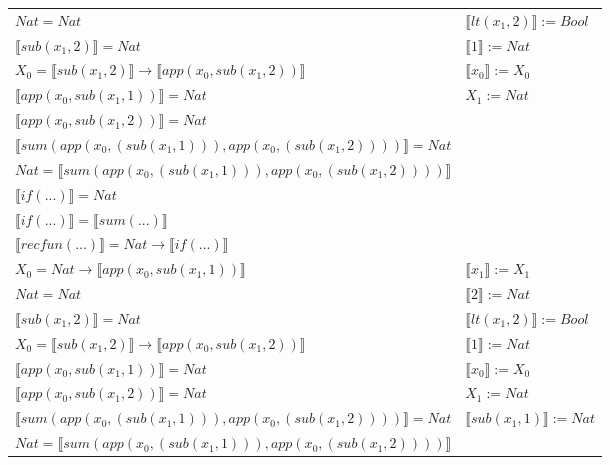 \begin{exercise}
\begin{description}
\begin{center}
\begin{longtable}[!h]{ | l | l | }
                        $Nat = Nat$ & $ \llbracket lt(x_1 , 2) \rrbracket := Bool$ \\
                        $ \llbracket sub(x_1,2) \rrbracket = Nat$ & $ \llbracket 1 \rrbracket := Nat$ \\
                        $X_0 =  \llbracket sub(x_1,2) \rrbracket \to  \llbracket app(x_0, sub(x_1,2)) \rrbracket$ & $ \llbracket x_0 \rrbracket := X_0$  \\
                        $ \llbracket app(x_0, sub(x_1,1)) \rrbracket = Nat$ & $X_1 := Nat$\\
                        $ \llbracket app(x_0, sub(x_1,2)) \rrbracket = Nat$ & \\
                        $ \llbracket sum(app(x_0, (sub(x_1,1))), app(x_0, (sub(x_1,2))))  \rrbracket = Nat$ & \\
                        $Nat =  \llbracket sum(app(x_0, (sub(x_1,1))), app(x_0, (sub(x_1,2)))) \rrbracket$ & \\
                        $ \llbracket if(...) \rrbracket = Nat$ & \\
                        $ \llbracket if(...) \rrbracket =  \llbracket sum(...) \rrbracket$ & \\
                        $ \llbracket recfun(...) \rrbracket =   Nat  \to  \llbracket if(...) \rrbracket $ & \\
                    \hline
                        $X_0 = Nat \to  \llbracket app(x_0, sub(x_1,1)) \rrbracket$ &   $ \llbracket x_1 \rrbracket := X_1$ \\
                        $Nat = Nat$ & $ \llbracket 2 \rrbracket := Nat$ \\
                        $ \llbracket sub(x_1,2) \rrbracket = Nat$ & $ \llbracket lt(x_1 , 2) \rrbracket := Bool$ \\
                        $X_0 =  \llbracket sub(x_1,2) \rrbracket \to  \llbracket app(x_0, sub(x_1,2)) \rrbracket$ &  $ \llbracket 1 \rrbracket := Nat$ \\
                        $ \llbracket app(x_0, sub(x_1,1)) \rrbracket = Nat$ & $ \llbracket x_0 \rrbracket := X_0$ \\
                        $ \llbracket app(x_0, sub(x_1,2)) \rrbracket = Nat$ & $X_1 := Nat$ \\
                        $ \llbracket sum(app(x_0, (sub(x_1,1))), app(x_0, (sub(x_1,2))))  \rrbracket = Nat$ & $ \llbracket sub(x_1,1) \rrbracket := Nat$ \\
                        $Nat =  \llbracket sum(app(x_0, (sub(x_1,1))), app(x_0, (sub(x_1,2)))) \rrbracket$ & \\

\end{longtable}
\end{center}
\end{description}
\end{exercise}
